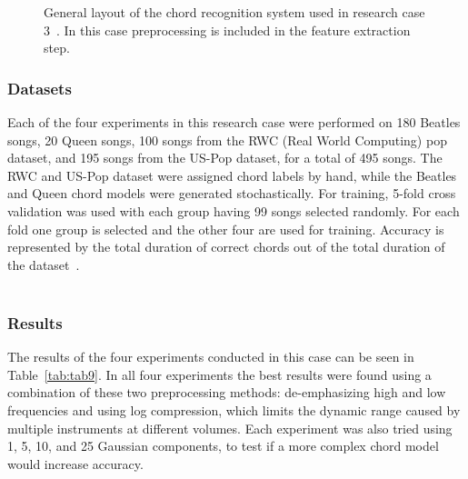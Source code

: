 \documentclass{sig-alternate}
\begin{document}


\begin{figure}[h]
\centering
{}
\caption{General layout of the chord recognition system used in research case 3~\cite{TaeMin:2014}. In this case preprocessing is included in the feature extraction step.}
\label{fig:fig3}
\end{figure}

\subsubsection{Datasets}

Each of the four experiments in this research case were performed on 180 Beatles songs, 20 Queen songs, 100 songs from the RWC (Real World Computing) pop dataset, and 195 songs from the US-Pop dataset, for a total of 495 songs. The RWC and US-Pop dataset were assigned chord labels by hand, while the Beatles and Queen chord models were generated stochastically. For training, 5-fold cross validation was used with each group having 99 songs selected randomly. For each fold one group is selected and the other four are used for training. Accuracy is represented by the total duration of correct chords out of the total duration of the dataset~\cite{TaeMin:2014}. \\ \\

\subsubsection{Results}

The results of the four experiments conducted in this case can be seen in Table~\ref{tab:tab9}. In all four experiments the best results were found using a combination of these two preprocessing methods: de-emphasizing high and low frequencies and using log compression, which limits the dynamic range caused by multiple instruments at different volumes. Each experiment was also tried using 1, 5, 10, and 25 Gaussian components, to test if a more complex chord model would increase accuracy. 
\end{document}
